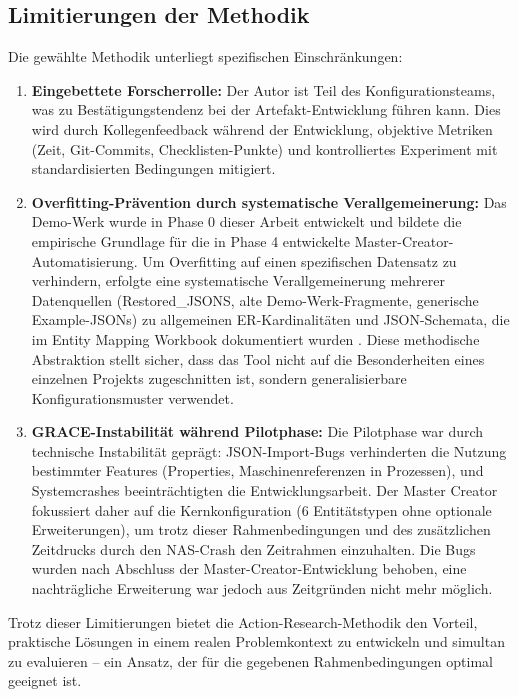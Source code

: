 \subsection{Limitierungen der Methodik}
\label{subsec:LimitierungenMethodik}

Die gewählte Methodik unterliegt spezifischen Einschränkungen:

\begin{enumerate}
    \item \textbf{Eingebettete Forscherrolle:} Der Autor ist Teil des Konfigurationsteams, was zu Bestätigungstendenz bei der Artefakt-Entwicklung führen kann. Dies wird durch Kollegenfeedback während der Entwicklung, objektive Metriken (Zeit, Git-Commits, Checklisten-Punkte) und kontrolliertes Experiment mit standardisierten Bedingungen mitigiert.

    \item \textbf{Overfitting-Prävention durch systematische Verallgemeinerung:} Das Demo-Werk wurde in Phase 0 dieser Arbeit entwickelt und bildete die empirische Grundlage für die in Phase 4 entwickelte Master-Creator-Automatisierung. Um Overfitting auf einen spezifischen Datensatz zu verhindern, erfolgte eine systematische Verallgemeinerung mehrerer Datenquellen (Restored\_JSONS, alte Demo-Werk-Fragmente, generische Example-JSONs) zu allgemeinen ER-Kardinalitäten und JSON-Schemata, die im Entity Mapping Workbook dokumentiert wurden \citep{mayring:qualitative2015}. Diese methodische Abstraktion stellt sicher, dass das Tool nicht auf die Besonderheiten eines einzelnen Projekts zugeschnitten ist, sondern generalisierbare Konfigurationsmuster verwendet.

    \item \textbf{GRACE-Instabilität während Pilotphase:} Die Pilotphase war durch technische Instabilität geprägt: JSON-Import-Bugs verhinderten die Nutzung bestimmter Features (Properties, Maschinenreferenzen in Prozessen), und Systemcrashes beeinträchtigten die Entwicklungsarbeit. Der Master Creator fokussiert daher auf die Kernkonfiguration (6 Entitätstypen ohne optionale Erweiterungen), um trotz dieser Rahmenbedingungen und des zusätzlichen Zeitdrucks durch den NAS-Crash den Zeitrahmen einzuhalten. Die Bugs wurden nach Abschluss der Master-Creator-Entwicklung behoben, eine nachträgliche Erweiterung war jedoch aus Zeitgründen nicht mehr möglich.
\end{enumerate}

Trotz dieser Limitierungen bietet die Action-Research-Methodik den Vorteil, praktische Lösungen in einem realen Problemkontext zu entwickeln und simultan zu evaluieren -- ein Ansatz, der für die gegebenen Rahmenbedingungen optimal geeignet ist.
